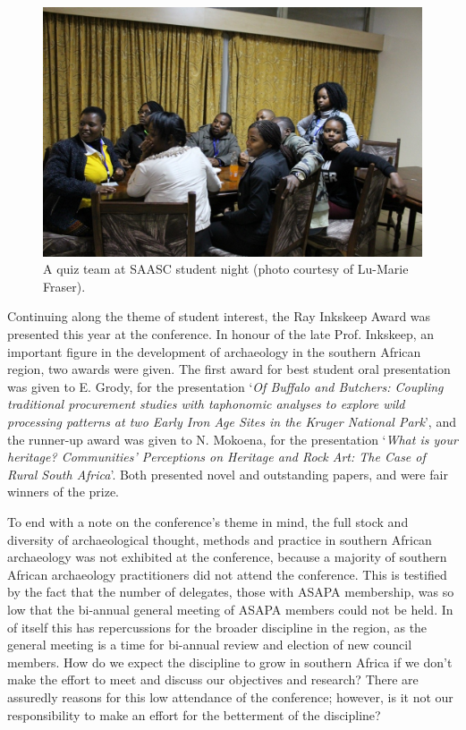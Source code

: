 	\begin{figure}
		\includegraphics[width=\linewidth]{figures/asapa_03}%
		\caption{A quiz team at SAASC student night (photo courtesy of Lu-Marie Fraser).}
		\label{asapa_03} %
	\end{figure}
	
	Continuing along the theme of student interest, the Ray Inkskeep Award was presented this year at the conference. In honour of the late Prof. Inkskeep, an important figure in the development of archaeology in the southern African region, two awards were given. The first award for best student oral presentation was given to E. Grody, for the presentation ‘\textit{Of Buffalo and Butchers: Coupling traditional procurement studies with taphonomic analyses to explore wild processing patterns at two Early Iron Age Sites in the Kruger National Park}’, and the runner-up award was given to N. Mokoena, for the presentation ‘\textit{What is your heritage? Communities’ Perceptions on Heritage and Rock Art: The Case of Rural South Africa}’.  Both presented novel and outstanding papers, and were fair winners of the prize. 
				
	To end with a note on the conference's theme in mind, the full stock and diversity of archaeological thought, methods and practice in southern African archaeology was not exhibited at the conference, because a majority of southern African archaeology practitioners did not attend the conference.  This is testified by the fact that the number of delegates, those with ASAPA membership, was so low that the bi-annual general meeting of ASAPA members could not be held. In of itself this has repercussions for the broader discipline in the region, as the general meeting is a time for bi-annual review and election of new council members. How do we expect the discipline to grow in southern Africa if we don’t make the effort to meet and discuss our objectives and research? There are assuredly reasons for this low attendance of the conference; however, is it not our responsibility to make an effort for the betterment of the discipline? 
	
		

\label{asapa:lastpage}
\closingarticle
